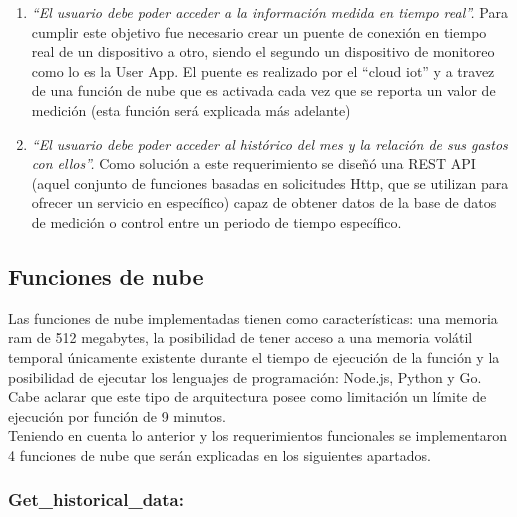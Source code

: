 \begin{enumerate}
	\item \textsl{``El usuario debe poder acceder a la información medida en tiempo real''.} Para cumplir este objetivo fue necesario crear un puente de conexión en tiempo real de un dispositivo a otro, siendo el segundo un dispositivo de monitoreo como lo es la User App. El puente es realizado por el “cloud iot” y a travez de una función de nube que es activada cada vez que se reporta un valor de medición (esta función será explicada más adelante)
	\item \textsl{``El usuario debe poder acceder al histórico del mes y la relación de sus gastos con ellos''.} Como solución a este requerimiento se diseñó una REST API (aquel conjunto de funciones basadas en solicitudes Http, que se utilizan para ofrecer un servicio en específico) capaz de obtener datos de la base de datos de medición o control entre un periodo de tiempo específico. 
\end{enumerate}


\subsection{Funciones de nube}
Las funciones de nube implementadas tienen como características: una memoria ram de 512 megabytes, la posibilidad de tener acceso a una memoria volátil temporal únicamente existente durante el tiempo de ejecución de la función y la posibilidad de ejecutar los lenguajes de programación: Node.js, Python y Go. Cabe aclarar que este tipo de arquitectura posee como limitación un límite de ejecución por función de 9 minutos.
\vspace{0.5cm}\\
Teniendo en cuenta lo anterior y los requerimientos funcionales se implementaron 4 funciones de nube que serán explicadas en los siguientes apartados.

\subsubsection{Get\_historical\_data:}

